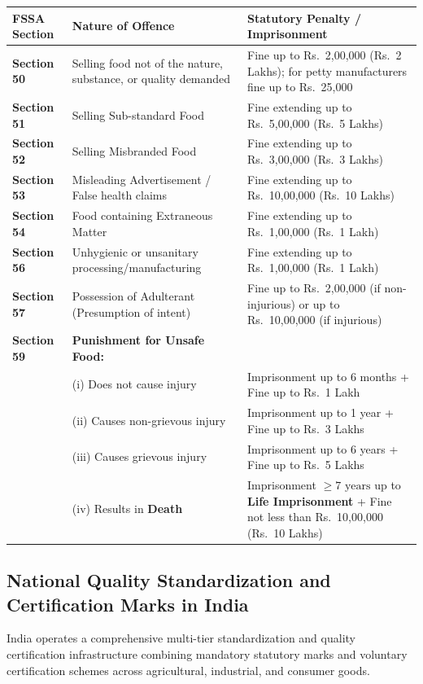 \documentclass[11pt,a4paper,oneside]{article}
\begin{document}
\begin{center}
\begin{tabular}{@{}p{2.4cm} p{4.6cm} p{9.0cm}@{}}
\toprule
\textbf{FSSA Section} & \textbf{Nature of Offence} & \textbf{Statutory Penalty / Imprisonment} \tabularnewline
\midrule
\textbf{Section 50} & Selling food not of the nature, substance, or quality demanded & Fine up to Rs.~2,00,000 (Rs.~2 Lakhs); for petty manufacturers fine up to Rs.~25,000 \tabularnewline
\textbf{Section 51} & Selling Sub-standard Food & Fine extending up to Rs.~5,00,000 (Rs.~5 Lakhs) \tabularnewline
\textbf{Section 52} & Selling Misbranded Food & Fine extending up to Rs.~3,00,000 (Rs.~3 Lakhs) \tabularnewline
\textbf{Section 53} & Misleading Advertisement / False health claims & Fine extending up to Rs.~10,00,000 (Rs.~10 Lakhs) \tabularnewline
\textbf{Section 54} & Food containing Extraneous Matter & Fine extending up to Rs.~1,00,000 (Rs.~1 Lakh) \tabularnewline
\textbf{Section 56} & Unhygienic or unsanitary processing/manufacturing & Fine extending up to Rs.~1,00,000 (Rs.~1 Lakh) \tabularnewline
\textbf{Section 57} & Possession of Adulterant (Presumption of intent) & Fine up to Rs.~2,00,000 (if non-injurious) or up to Rs.~10,00,000 (if injurious) \tabularnewline
\midrule
\textbf{Section 59} & \textbf{Punishment for Unsafe Food:} & \tabularnewline
 & (i) Does not cause injury & Imprisonment up to 6 months + Fine up to Rs.~1 Lakh \tabularnewline
 & (ii) Causes non-grievous injury & Imprisonment up to 1 year + Fine up to Rs.~3 Lakhs \tabularnewline
 & (iii) Causes grievous injury & Imprisonment up to 6 years + Fine up to Rs.~5 Lakhs \tabularnewline
 & (iv) Results in \textbf{Death} & Imprisonment $\ge 7\text{ years}$ up to \textbf{Life Imprisonment} + Fine not less than Rs.~10,00,000 (Rs.~10 Lakhs) \tabularnewline
\bottomrule
\end{tabular}
\end{center}

\subsection{National Quality Standardization and Certification Marks in India}

India operates a comprehensive multi-tier standardization and quality certification infrastructure combining mandatory statutory marks and voluntary certification schemes across agricultural, industrial, and consumer goods.
\end{document}
